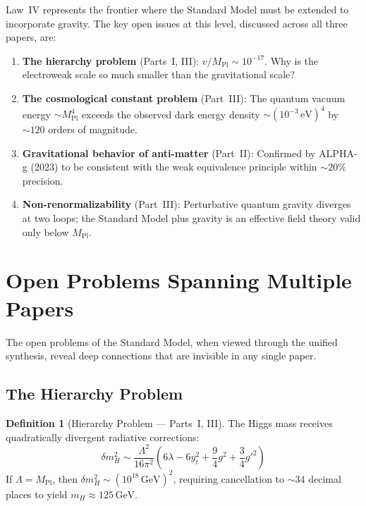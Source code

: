 \documentclass[12pt]{article}
\theoremstyle{definition}
\newtheorem{definition}[theorem]{Definition}
\theoremstyle{remark}
\newcommand{\GeV}{\,\mathrm{GeV}}
\newcommand{\Mpl}{M_{\mathrm{Pl}}}
\begin{document}
Law~IV represents the frontier where the Standard Model must be extended to incorporate gravity. The key open issues at this level, discussed across all three papers, are:

\begin{enumerate}
\item \textbf{The hierarchy problem} (Parts~I, III): $v/\Mpl \sim 10^{-17}$. Why is the electroweak scale so much smaller than the gravitational scale?
\item \textbf{The cosmological constant problem} (Part~III): The quantum vacuum energy $\sim \Mpl^4$ exceeds the observed dark energy density $\sim (10^{-3}\,\mathrm{eV})^4$ by $\sim 120$ orders of magnitude.
\item \textbf{Gravitational behavior of anti-matter} (Part~II): Confirmed by ALPHA-g (2023) to be consistent with the weak equivalence principle within $\sim 20\%$ precision.
\item \textbf{Non-renormalizability} (Part~III): Perturbative quantum gravity diverges at two loops; the Standard Model plus gravity is an effective field theory valid only below $\Mpl$.
\end{enumerate}


\section{Open Problems Spanning Multiple Papers}
\label{sec:open-problems}

The open problems of the Standard Model, when viewed through the unified synthesis, reveal deep connections that are invisible in any single paper.

\subsection{The Hierarchy Problem}

\begin{definition}[Hierarchy Problem --- Parts~I, III]
The Higgs mass receives quadratically divergent radiative corrections:
\begin{equation}
\delta m_H^2 \sim \frac{\Lambda^2}{16\pi^2}\left(6\lambda - 6y_t^2 + \frac{9}{4}g^2 + \frac{3}{4}g'^2\right)
\end{equation}
If $\Lambda = \Mpl$, then $\delta m_H^2 \sim (10^{18}\GeV)^2$, requiring cancellation to $\sim 34$ decimal places to yield $m_H \approx 125\GeV$.
\end{definition}
\end{document}

